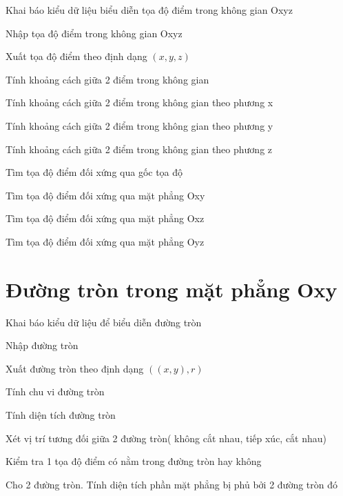 \begin{problem}
    Khai báo kiểu dữ liệu biểu diễn tọa độ điểm trong không gian Oxyz
\end{problem}
\begin{problem}
    Nhập tọa độ điểm trong không gian Oxyz
\end{problem}
\begin{problem}
    Xuất tọa độ điểm theo định dạng $(x, y, z)$
\end{problem}
\begin{problem}
    Tính khoảng cách giữa 2 điểm trong không gian
\end{problem}
\begin{problem}
    Tính khoảng cách giữa 2 điểm trong không gian theo phương x
\end{problem}
\begin{problem}
    Tính khoảng cách giữa 2 điểm trong không gian theo phương y
\end{problem}
\begin{problem}
    Tính khoảng cách giữa 2 điểm trong không gian theo phương z
\end{problem}
\begin{problem}
    Tìm tọa độ điểm đối xứng qua gốc tọa độ
\end{problem}
\begin{problem}
    Tìm tọa độ điểm đối xứng qua mặt phẳng Oxy
\end{problem}
\begin{problem}
    Tìm tọa độ điểm đối xứng qua mặt phẳng Oxz
\end{problem}
\begin{problem}
    Tìm tọa độ điểm đối xứng qua mặt phẳng Oyz
\end{problem}

\section{Đường tròn trong mặt phẳng Oxy}

\begin{problem}
    Khai báo kiểu dữ liệu để biểu diễn đường tròn
\end{problem}
\begin{problem}
    Nhập đường tròn
\end{problem}
\begin{problem}
    Xuất đường tròn theo định dạng $((x, y), r)$
\end{problem}
\begin{problem}
    Tính chu vi đường tròn
\end{problem}
\begin{problem}
    Tính diện tích đường tròn
\end{problem}
\begin{problem}
    Xét vị trí tương đối giữa 2 đường tròn( không cắt nhau, tiếp xúc, cắt nhau)
\end{problem}
\begin{problem}
    Kiểm tra 1 tọa độ điểm có nằm trong đường tròn hay không
\end{problem}
\begin{problem}
    Cho 2 đường tròn. Tính diện tích phần mặt phẳng bị phủ bởi 2 đường tròn đó
\end{problem}

